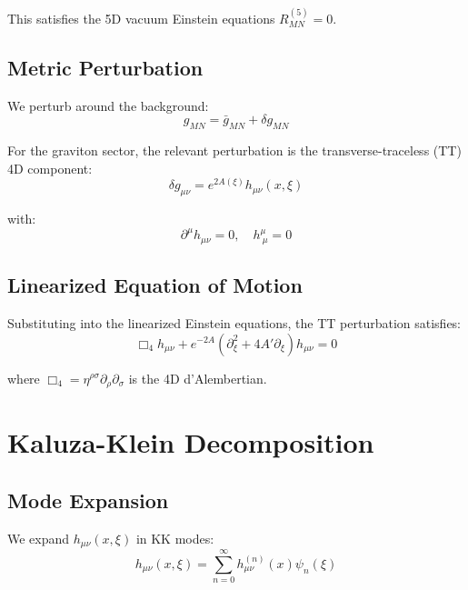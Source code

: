 \documentclass[11pt,a4paper]{article}
\begin{document}
This satisfies the 5D vacuum Einstein equations $R_{MN}^{(5)} = 0$.

\subsection{Metric Perturbation}

We perturb around the background:
\begin{equation}
g_{MN} = \bar{g}_{MN} + \delta g_{MN}
\label{eq:metric-perturbation}
\end{equation}

For the graviton sector, the relevant perturbation is the transverse-traceless (TT)
4D component:
\begin{equation}
\delta g_{\mu\nu} = e^{2A(\xi)} h_{\mu\nu}(x,\xi)
\label{eq:TT-perturbation}
\end{equation}

with:
\begin{equation}
\partial^\mu h_{\mu\nu} = 0, \quad h^\mu_{~\mu} = 0
\label{eq:TT-gauge}
\end{equation}

\subsection{Linearized Equation of Motion}

Substituting into the linearized Einstein equations, the TT perturbation satisfies:
\begin{equation}
\Box_4 h_{\mu\nu} + e^{-2A} \left( \partial_\xi^2 + 4A' \partial_\xi \right) h_{\mu\nu} = 0
\label{eq:linearized-EOM}
\end{equation}

where $\Box_4 = \eta^{\rho\sigma}\partial_\rho\partial_\sigma$ is the 4D d'Alembertian.

\section{Kaluza-Klein Decomposition}

\subsection{Mode Expansion}

We expand $h_{\mu\nu}(x,\xi)$ in KK modes:
\begin{equation}
h_{\mu\nu}(x,\xi) = \sum_{n=0}^{\infty} h_{\mu\nu}^{(n)}(x) \psi_n(\xi)
\label{eq:KK-expansion}
\end{equation}
\end{document}
